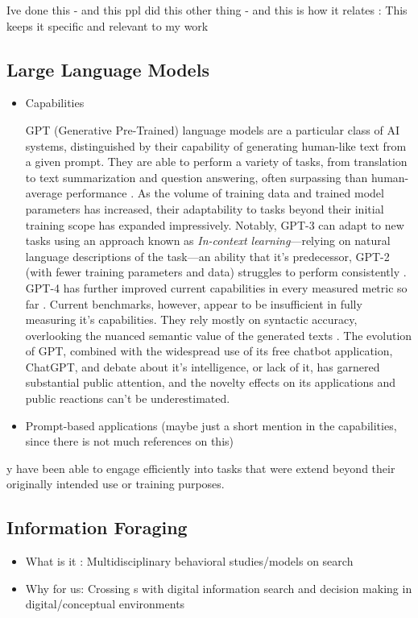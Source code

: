 \documentclass[sn-mathphys, Numbered]{sn-jnl}%
\theoremstyle{thmstyleone}%
\theoremstyle{thmstyletwo}%
\theoremstyle{thmstylethree}%
\begin{document}
Ive done this - and this ppl did this other thing - and this is how it relates   : This keeps it specific and relevant to my work


\subsection{Large Language Models}\label{Large Language Models}

\begin{itemize}
  \item Capabilities

GPT (Generative Pre-Trained) language models are a particular class of AI systems, distinguished by their capability of generating human-like text from a given prompt. They are able to perform a variety of tasks, from translation to text summarization and question answering, often surpassing than human-average performance \parencite{srivastava_beyond_2022}.  As the volume of training data and trained model parameters has increased, their adaptability to tasks beyond their initial training scope has expanded impressively.  Notably, GPT-3 can adapt to new tasks using an approach known as \textit{In-context learning}---relying on natural language descriptions of the task---an ability that it's predecessor, GPT-2 (with fewer training parameters and data) struggles to perform consistently \parencite{bommasani_opportunities_2022, wei_emergent_2022}. GPT-4 has further improved current capabilities in every measured metric so far \parencite{openai2023gpt4}. Current benchmarks, however,  appear to be insufficient in fully measuring it's capabilities. They rely mostly on syntactic accuracy, overlooking the nuanced semantic value of the generated texts \parencite{bubeck_sparks_2023}.  The evolution of GPT, combined with the widespread use of its free chatbot application, ChatGPT, and debate about it's intelligence, or lack of it, has garnered substantial public attention, and the novelty effects on its applications and public reactions can't be underestimated.

  \item Prompt-based applications (maybe just a short mention in the capabilities, since there is not much references on this)

\end{itemize}

y have been able to engage efficiently into tasks that were extend beyond their originally intended use or training purposes.


\subsection{Information Foraging}\label{Information Foraging}
\begin{itemize}
    \item What is it : Multidisciplinary behavioral studies/models on search
    \item Why for us: Crossing s with digital information search and decision making in digital/conceptual environments

\end{itemize}
\end{document}
